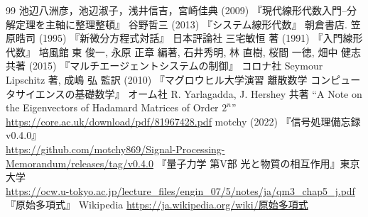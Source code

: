\documentclass[titlepage]{ltjsreport}
\theoremstyle{definition} %
\begin{document}
	\maketitle
	{\scriptsize \tableofcontents}
	
	
	
	
	
	
	
	
	
	
	
	\begin{thebibliography}{99}
		 池辺八洲彦，池辺淑子，浅井信吉，宮崎佳典 (2009) 『現代線形代数入門--分解定理を主軸に整理整頓』
		 谷野哲三 (2013) 『システム線形代数』 朝倉書店.
		 笠原晧司 (1995) 『新微分方程式対話』 日本評論社
		 三宅敏恒 著 (1991) 『入門線形代数』 培風館
		 東 俊一, 永原 正章 編著, 石井秀明, 林 直樹, 桜間 一徳, 畑中 健志 共著 (2015) 『マルチエージェントシステムの制御』 コロナ社
		Seymour Lipschitz 著, 成嶋 弘 監訳 (2010) 『マグロウヒル大学演習 離散数学 コンピュータサイエンスの基礎数学』 オーム社
		 R. Yarlagadda, J. Hershey 共著 ``A Note on the Eigenvectors of Hadamard Matrices of Order $2^n$'' \url{https://core.ac.uk/download/pdf/81967428.pdf}
		 motchy (2022) 『信号処理備忘録 v0.4.0』\\ \url{https://github.com/motchy869/Signal-Processing-Memorandum/releases/tag/v0.4.0}
		 『量子力学 第V部 光と物質の相互作用』東京大学\\ \url{https://ocw.u-tokyo.ac.jp/lecture_files/engin_07/5/notes/ja/qm3_chap5_j.pdf}
		 『原始多項式』 Wikipedia \url{https://ja.wikipedia.org/wiki/原始多項式}
	\end{thebibliography}
\end{document}
